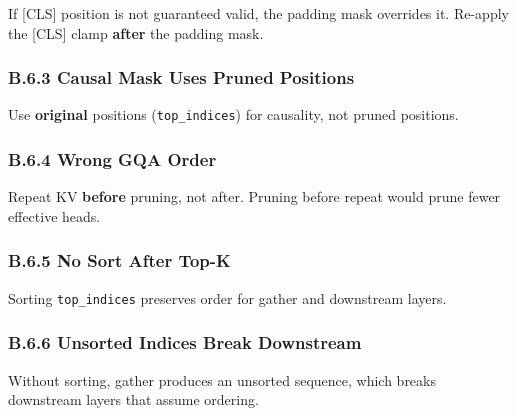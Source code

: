 If [CLS] position is not guaranteed valid, the padding mask overrides it. 
Re-apply the [CLS] clamp \textbf{after} the padding mask.

\subsubsection{B.6.3 Causal Mask Uses Pruned Positions}

Use \textbf{original} positions (\texttt{top\_indices}) for causality, not pruned 
positions.

\subsubsection{B.6.4 Wrong GQA Order}

Repeat KV \textbf{before} pruning, not after. Pruning before repeat would prune 
fewer effective heads.

\subsubsection{B.6.5 No Sort After Top-K}

Sorting \texttt{top\_indices} preserves order for gather and downstream layers.

\subsubsection{B.6.6 Unsorted Indices Break Downstream}

Without sorting, gather produces an unsorted sequence, which breaks 
downstream layers that assume ordering.

